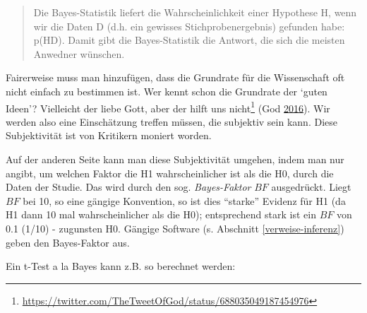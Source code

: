 \documentclass[12pt,ngerman,]{book}
\let\rmarkdownfootnote\footnote%
\def\footnote{\protect\rmarkdownfootnote}
\renewcommand{\href}[2]{#2\footnote{\url{#1}}}
\theoremstyle{definition}
\theoremstyle{definition}
\theoremstyle{remark}
\begin{document}
\begin{quote}
Die Bayes-Statistik liefert die Wahrscheinlichkeit einer Hypothese H,
wenn wir die Daten D (d.h. ein gewisses Stichprobenergebnis) gefunden
habe: p(H\textbar{}D). Damit gibt die Bayes-Statistik die Antwort, die
sich die meisten Anwedner wünschen.
\end{quote}

Fairerweise muss man hinzufügen, dass die Grundrate für die Wissenschaft
oft nicht einfach zu bestimmen ist. Wer kennt schon die Grundrate der
`guten Ideen'? Vielleicht der liebe Gott, aber
\href{https://twitter.com/TheTweetOfGod/status/688035049187454976}{der
hilft uns nicht} (God \protect\hyperlink{ref-god_i_2016}{2016}). Wir
werden also eine Einschätzung treffen müssen, die subjektiv sein kann.
Diese Subjektivität ist von Kritikern moniert worden.

Auf der anderen Seite kann man diese Subjektivität umgehen, indem man
nur angibt, um welchen Faktor die H1 wahrscheinlicher ist als die H0,
durch die Daten der Studie. Das wird durch den sog. \emph{Bayes-Faktor}
\(BF\) ausgedrückt. Liegt \(BF\) bei 10, so eine gängige Konvention, so
ist dies ``starke'' Evidenz für H1 (da H1 dann 10 mal wahrscheinlicher
als die H0); entsprechend stark ist ein \(BF\) von 0.1 (1/10) -
zugunsten H0. Gängige Software (s. Abschnitt \ref{verweise-inferenz})
geben den Bayes-Faktor aus.

Ein t-Test a la Bayes kann z.B. so berechnet werden:
\end{document}
